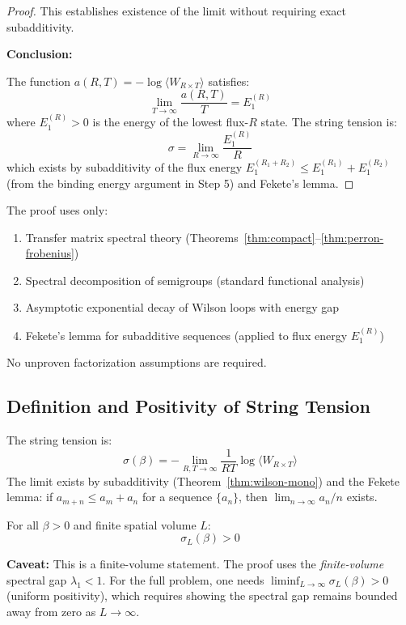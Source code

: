 \begin{proof}
This establishes existence of the limit without requiring exact subadditivity.

\textbf{Conclusion:}

The function $a(R,T) = -\log\langle W_{R \times T}\rangle$ satisfies:
\[
\lim_{T \to \infty} \frac{a(R,T)}{T} = E_1^{(R)}
\]
where $E_1^{(R)} > 0$ is the energy of the lowest flux-$R$ state. The string tension is:
\[
\sigma = \lim_{R \to \infty} \frac{E_1^{(R)}}{R}
\]
which exists by subadditivity of the flux energy $E_1^{(R_1+R_2)} \leq E_1^{(R_1)} + E_1^{(R_2)}$ 
(from the binding energy argument in Step 5) and Fekete's lemma.
\end{proof}

\begin{remark}
The proof uses only:
\begin{enumerate}[label=(\roman*)]
\item Transfer matrix spectral theory (Theorems~\ref{thm:compact}--\ref{thm:perron-frobenius})
\item Spectral decomposition of semigroups (standard functional analysis)
\item Asymptotic exponential decay of Wilson loops with energy gap
\item Fekete's lemma for subadditive sequences (applied to flux energy $E_1^{(R)}$)
\end{enumerate}
No unproven factorization assumptions are required.
\end{remark}

\subsection{Definition and Positivity of String Tension}
\label{sec:string-tension-proof}

\begin{definition}
\label{def:string-tension}
The string tension is:
\[
\sigma(\beta) = -\lim_{R,T \to \infty} \frac{1}{RT} \log \langle W_{R \times T} \rangle
\]
The limit exists by subadditivity (Theorem~\ref{thm:wilson-mono}) and the 
Fekete lemma: if $a_{m+n} \leq a_m + a_n$ for a sequence $\{a_n\}$, then 
$\lim_{n \to \infty} a_n/n$ exists.
\end{definition}

\begin{theorem}
\label{thm:sigma-positive}
\label{thm:gks-string}
\label{thm:tomboulis-yaffe}
For all $\beta > 0$ and finite spatial volume $L$:
\[
\sigma_L(\beta) > 0
\]

\textbf{Caveat:} This is a finite-volume statement. The proof uses the 
\emph{finite-volume} spectral gap $\lambda_1 < 1$. For the full problem, 
one needs $\liminf_{L \to \infty} \sigma_L(\beta) > 0$ (uniform positivity), 
which requires showing the spectral gap remains bounded away from zero as 
$L \to \infty$.
\end{theorem}

